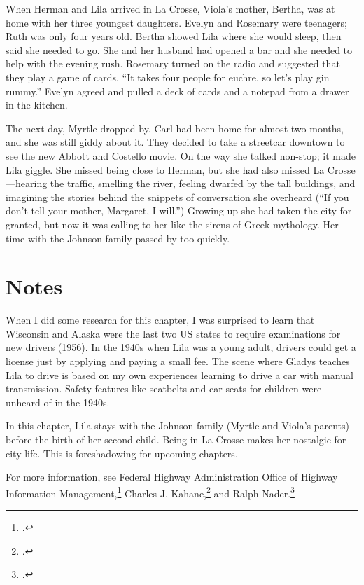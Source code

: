 \documentclass[
  american,
  letterpaper,
]{book}
\begin{document}
When Herman and Lila arrived in La Crosse, Viola's mother, Bertha, was
at home with her three youngest daughters. Evelyn and Rosemary were
teenagers; Ruth was only four years old. Bertha showed Lila where she
would sleep, then said she needed to go. She and her husband had opened
a bar and she needed to help with the evening rush. Rosemary turned on
the radio and suggested that they play a game of cards. ``It takes four
people for euchre, so let's play gin rummy.'' Evelyn agreed and pulled a
deck of cards and a notepad from a drawer in the kitchen.

The next day, Myrtle dropped by. Carl had been home for almost two
months, and she was still giddy about it. They decided to take a
streetcar downtown to see the new Abbott and Costello movie. On the way
she talked non-stop; it made Lila giggle. She missed being close to
Herman, but she had also missed La Crosse---hearing the traffic,
smelling the river, feeling dwarfed by the tall buildings, and imagining
the stories behind the snippets of conversation she overheard (``If you
don't tell your mother, Margaret, I will.'') Growing up she had taken
the city for granted, but now it was calling to her like the sirens of
Greek mythology. Her time with the Johnson family passed by too quickly.

\section{Notes}\label{notes-39}

When I did some research for this chapter, I was surprised to learn that
Wisconsin and Alaska were the last two US states to require examinations
for new drivers (1956). In the 1940s when Lila was a young adult,
drivers could get a license just by applying and paying a small fee. The
scene where Gladys teaches Lila to drive is based on my own experiences
learning to drive a car with manual transmission. Safety features like
seatbelts and car seats for children were unheard of in the 1940s.

In this chapter, Lila stays with the Johnson family (Myrtle and Viola's
parents) before the birth of her second child. Being in La Crosse makes
her nostalgic for city life. This is foreshadowing for upcoming
chapters.

For more information, see Federal Highway Administration Office of
Highway Information Management,\footnote{.} Charles J.
Kahane,\footnote{.} and Ralph Nader.\footnote{.}
\end{document}
